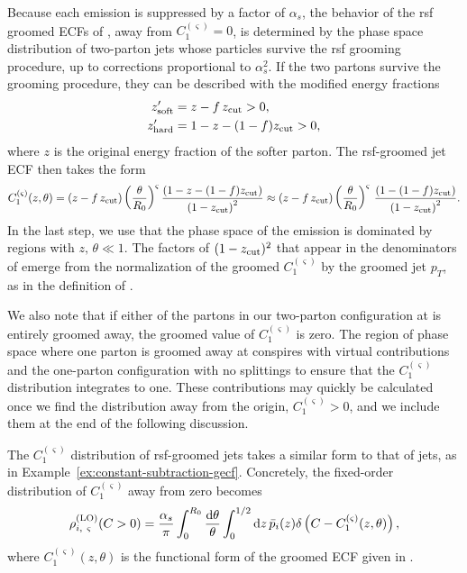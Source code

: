 Because each emission is suppressed by a factor of \(\alpha_s\), the behavior of the \gls{rsf} groomed ECFs of , away from \(C_1^{(\varsigma)} = 0\), is determined by the phase space distribution of two-parton jets whose particles survive the \gls{rsf} grooming procedure, up to corrections proportional to \(\alpha_s^2\).
%
If the two partons survive the grooming procedure, they can be described with the modified energy fractions
\begin{subequations}
\begin{align}
    z_{\rm soft}' &= z - f\,z_{\rm cut} > 0,
    \\
    z_{\rm hard}' &= 1 - z - (1-f)z_{\rm cut} > 0,
\end{align}
\end{subequations}
where \(z\) is the original energy fraction of the softer parton.
%
The \gls{rsf}-groomed jet ECF then takes the form
\begin{equation}
    C_1^{(\varsigma)}(z,\theta)
    =
    \left(z - f\,\zcut\right) \left(\frac{\theta}{R_0}\right)^\varsigma \frac{\left(1 - z - (1-f)\zcut\right)}{\left(1 - \zcut\right)^2}
    \approx
    \left(z - f\,\zcut\right)\left(\frac{\theta}{R_0}\right)^\varsigma
    \,
    \frac{\left(1 - (1-f)\zcut\right)}{\left(1 - \zcut\right)^2}
    \label{eq:oneEm_groomedECFdefn}
    .
\end{equation}
%
In the last step, we use that the phase space of the emission is dominated by regions with \(z,\,\theta \ll 1\).
%
The factors of \((1-z_{\rm cut})^2\) that appear in the denominators of  emerge from the normalization of the groomed \(C_1^{(\varsigma)}\) by the groomed jet \(p_T\), as in the definition of .

We also note that if either of the partons in our two-parton configuration at  is entirely groomed away, the groomed value of \(C_1^{(\varsigma)}\) is zero.
%
The region of phase space where one parton is groomed away at  conspires with virtual contributions and the one-parton configuration with no splittings to ensure that the \(C_1^{(\varsigma)}\) distribution integrates to one.
%
These contributions may quickly be calculated once we find the distribution away from the origin, \(C_1^{(\varsigma)} > 0\), and we include them at the end of the following discussion.


The \(C_1^{(\varsigma)}\) distribution of \gls{rsf}-groomed jets takes a similar form to that of  jets, as in Example~\ref{ex:constant-subtraction-gecf}.
%
Concretely, the fixed-order distribution of \(C_1^{(\varsigma)}\) away from zero becomes
%
\begin{align}
    \rho^{\rm(LO)}_{i,~\varsigma}(C>0)
    =
    \frac{\alpha_s}{\pi}\int_0^{R_0}\frac{\dd\theta}{\theta}
    \int_0^{1/2} \dd z\, \Bar{p}_i(z)
    \delta\left(C - C_1^{(\varsigma)}(z,\theta)\right),
    \label{eq:LO_dist_setup}
\end{align}
%
where  \(C_1^{(\varsigma)}(z,\theta)\) is the functional form of the groomed ECF given in .

